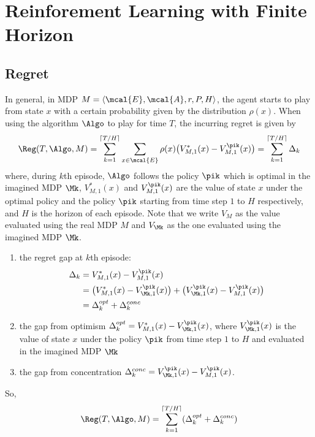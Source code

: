 \chapter{Reinforement Learning with Finite Horizon}
\label{ch:rl_finite_horizon}

    \section{Regret}
    \label{sec:regret}
    
        In general, in MDP $M=\langle\mcal{E},\mcal{A},r,P,H\rangle$, the agent starts to play from state $x$ with a certain probability given by the distribution $\rho(x)$. When using the algorithm $\Algo$ to play for time $T$, the incurring regret is given by
        \begin{align}
        \Reg(T,\Algo,M)=\sum_{k=1}^{\lceil T/H\rceil}\sum_{x\in\mcal{E}}\rho(x)\big(V_{M,1}^*(x) -V_{M,1}^{\pik}(x)\big) =\sum_{k=1}^{\lceil T/H\rceil}\Delta_k
        \end{align}
        where, during $k$th episode, $\Algo$ follows the policy $\pik$ which is optimal in the imagined MDP $\Mk$, $V^*_{M,1}(x)$ and $V_{M,1}^{\pik}(x)$ are the value of state $x$ under the optimal policy and the policy $\pik$ starting from time step $1$ to $H$ respectively, and $H$ is the horizon of each episode.
        Note that we write $V_M$ as the value evaluated using the real MDP $M$ and $V_{\Mk}$ as the one evaluated using the imagined MDP $\Mk$.
        
        \begin{enumerate}
        \item the regret gap at $k$th episode:
        \begin{align*}
        \Delta_k &=V_{M,1}^*(x) -V_{M,1}^{\pik}(x) \\
        &=\big(V^*_{M,1}(x) -V^{\pik}_{\Mk,1}(x)\big) +\big(V^{\pik}_{\Mk,1}(x) -V_{M,1}^{\pik}(x)\big) \\
        &=\Delta_k^{opt}+\Delta_k^{conc}
        \end{align*}
        \item the gap from optimism $\Delta_k^{opt}=V^*_{M,1}(x) -V^{\pik}_{\Mk,1}(x)$, where $V^{\pik}_{\Mk,1}(x)$ is the value of state $x$ under the policy $\pik$ from time step $1$ to $H$ and evaluated in the imagined MDP $\Mk$
        \item the gap from concentration $\Delta_k^{conc}=V^{\pik}_{\Mk,1}(x) -V_{M,1}^{\pik}(x)$.
        \end{enumerate}
        So,
        \begin{equation}
        \label{eq:eq_6}
        \Reg(T,\Algo,M)= \sum_{k=1}^{\lceil T/H\rceil}(\Delta_k^{opt}+\Delta_k^{conc})
        \end{equation}
    
